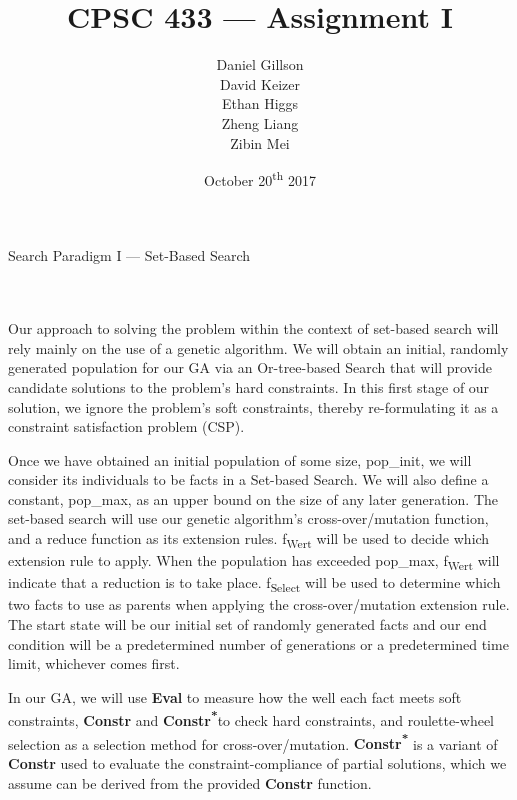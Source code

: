 \documentclass[11pt, oneside]{article}   	%
\title{\vspace{40mm}CPSC 433 --- Assignment I}
\author{
	Daniel Gillson\\
	David Keizer\\
	Ethan Higgs\\
	Zheng Liang\\
	Zibin Mei}
\date{October 20\textsuperscript{th} 2017}
\newenvironment{cmr}{\fontfamily{cmr}\selectfont}{\par}
\begin{document}
\maketitle
\break

\centerline{{\Large Search Paradigm I --- Set-Based Search}}

\\\\
\begin{cmr}
\indent Our approach to solving the problem within the context of set-based search will rely mainly on the use of a genetic algorithm.
We will obtain an initial, randomly generated population for our GA via an Or-tree-based Search that will provide candidate solutions to the problem's
hard constraints. In this first stage of our solution, we ignore the problem's soft constraints, thereby re-formulating it as a constraint satisfaction problem (CSP).

\indent Once we have obtained an initial population of some size, pop_init, we will consider its individuals to be facts in a Set-based Search.
We will also define a constant, pop_max, as an upper bound on the size of any later generation.
The set-based search will use our genetic algorithm's cross-over/mutation function, and a reduce function as its extension rules.
f\textsubscript{Wert} will be used to decide which extension rule to apply.
When the population has exceeded pop_max, f\textsubscript{Wert} will indicate that a reduction is to take place.
f\textsubscript{Select} will be used to determine which two facts to use as parents when applying the cross-over/mutation extension rule.
The start state will be our initial set of randomly generated facts and our end condition will be a predetermined number of generations or a predetermined time limit, whichever comes first.

\indent In our GA, we will use \textbf{Eval} to measure how the well each fact meets soft constraints, \textbf{Constr} and \textbf{Constr\textsuperscript{*}}to check hard constraints, and roulette-wheel selection as a selection method for cross-over/mutation.
\textbf{Constr\textsuperscript{*}} is a variant of \textbf{Constr} used to evaluate the constraint-compliance of partial solutions, which we assume can be derived from the provided \textbf{Constr} function.
\end{cmr}

\end{document}
